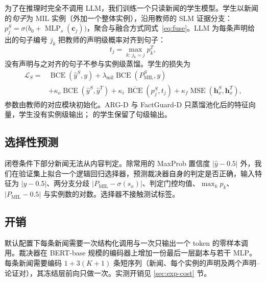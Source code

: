 为了在推理时完全不调用 LLM，我们训练一个只读新闻的学生模型。学生以新闻的\emph{句子}为 MIL 实例（外加一个整体实例），沿用教师的 SLM 证据分支：$p_j^S=\sigma\big(b_0+\operatorname{MLP}_s(\bm c_j)\big)$，聚合与融合方式同式~\eqref{eq:fuse}。LLM 为每条声明给出的句子编号 $j_k$ 把教师的声明级概率对齐到句子：
\begin{equation}
t_j=\max_{k:\,j_k=j}p_k^{T},
\end{equation}
没有声明与之对齐的句子不参与实例级蒸馏。学生的损失为
\begin{equation}
\begin{aligned}
\mathcal L_S={}&\operatorname{BCE}(\hat y^S,y)+\lambda_{\mathrm{mil}}\operatorname{BCE}(P^S_{\mathrm{MIL}},y)\\
&+\kappa_{o}\operatorname{BCE}(\hat y^S,\hat y^T)+\kappa_{i}\,\overline{\operatorname{BCE}}(p^S_j,t_j)+\kappa_{f}\operatorname{MSE}(\bm h^S_x,\bm h^T_x),
\end{aligned}
\end{equation}
参数由教师的对应模块初始化。ARG-D 与 FactGuard-D 只蒸馏池化后的特征向量，学生没有实例级输出；\student{} 的学生保留了句级输出。

\subsection{选择性预测}\label{sec:selective}

闭卷条件下部分新闻无法从内容判定。除常用的 MaxProb 置信度 $|\hat y-0.5|$ 外，我们在验证集上拟合一个逻辑回归选择器，预测裁决器自身的判定是否正确，输入特征为 $|\hat y-0.5|$、两分支分歧 $|P_{\mathrm{MIL}}-\sigma(s_x)|$、判定门控均值、$\max_k p_k$、$|P_{\mathrm{MIL}}-0.5|$ 与实例数的对数。选择器不接触测试标签。

\subsection{开销}\label{sec:cost}

默认配置下每条新闻需要一次结构化调用与一次只输出一个 token 的零样本调用。裁决器在 BERT-base 规模的编码器上增加一份最后一层副本与若干 MLP。每条新闻需要编码 $1+3(K{+}1)$ 条短序列（新闻、每个实例的声明及两个声明--论证对），其冻结层前向只做一次。实测开销见 \ref{sec:exp-cost} 节。

